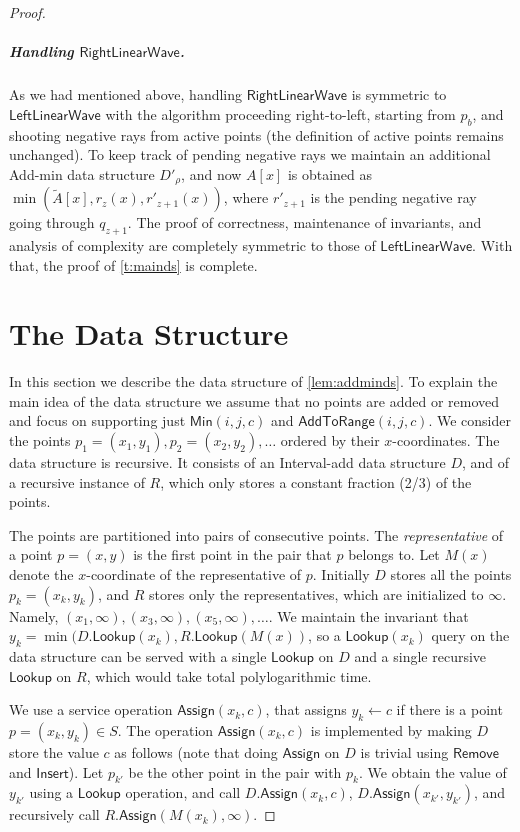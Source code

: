 \documentclass[a4paper,UKenglish,cleveref, autoref, thm-restate]{lipics-v2021}
\newcommand{\AtR}{\mathsf{AddToRange}}
\newcommand{\LLW}{\mathsf{LeftLinearWave}}
\newcommand{\RLW}{\mathsf{RightLinearWave}}
\newcommand{\assign}{\leftarrow}
\newcommand{\AssignOp}{\mathsf{Assign}}
\newcommand{\local}{\text{short }}
\newcommand{\addmin}{\text{Add-min }}
\newcommand{\Insert}{\mathsf{Insert}}
\newcommand{\Remove}{\mathsf{Remove}}
\newcommand{\Lookup}{\mathsf{Lookup}}
\newcommand{\Min}{\mathsf{Min}}
\newcommand{\TA}{\tilde{A}}
\newcommand{\para}[1]{\vspace{-0.1in} \subparagraph*{#1}}
\newcommand{\ray}{r}
\begin{document}
\begin{proof}
\para{Handling $\RLW$.} As we had mentioned above, handling $\RLW$ is symmetric to $\LLW$ with the algorithm proceeding right-to-left, starting from $p_b$, and shooting negative rays from active points (the definition of active points remains unchanged). To keep track of pending \local negative rays we maintain an additional Add-min data structure $D'_{\rho}$, and now $A[x]$ is obtained as $\min(\TA[x],\ray_z(x),\ray'_{z+1}(x))$, where $\ray'_{z+1}$ is the pending negative ray going through $q_{z+1}$. The proof of correctness, maintenance of invariants, and analysis of complexity are completely symmetric to those of $\LLW$.   
With that, the proof of \cref{t:mainds} is complete.

\section{The \addmin Data Structure}\label{sec:minadd}
In this section we describe the \addmin data structure of \cref{lem:addminds}.
To explain the main idea of the data structure we assume that no points are added or removed and focus on supporting just $\Min(i,j,c)$ and $\AtR(i,j,c)$. 
We consider the points 
$p_1=(x_1,y_1), p_2=(x_2,y_2), \ldots$ ordered by their $x$-coordinates.
The \addmin data structure is recursive. It consists of an Interval-add data structure $D$, and of a recursive instance of \addmin $R$, which only stores a constant fraction (2/3) of the points.

The points are partitioned into pairs of consecutive points. 
The {\em representative} of a point $p=(x,y)$ is the first point in the pair that $p$ belongs to. Let $M(x)$ denote the $x$-coordinate of the representative of $p$. 
Initially $D$ stores all the points $p_k=(x_k,y_k)$, and $R$ stores only the representatives, which are initialized to $\infty$. Namely, $(x_1,\infty), (x_3,\infty), (x_5,\infty), \ldots$.
We maintain the invariant that $y_k = \min(D.\Lookup(x_k), R.\Lookup(M(x))$, so a $\Lookup(x_k)$ query on the data structure can be served with a single $\Lookup$ on $D$ and a single recursive $\Lookup$ on $R$, which would take total polylogarithmic time.

We use a service operation $\AssignOp(x_k,c)$, that assigns $y_k \assign c$ if there is a point $p=(x_k,y_k) \in S$.
The operation $\AssignOp(x_k,c)$ is implemented by making $D$ store the value $c$ as follows (note that doing $\AssignOp$ on $D$ is trivial using $\Remove$ and $\Insert$). Let $p_{k'}$ be the other point in the pair with $p_k$. We obtain the value of $y_{k'}$ using a $\Lookup$ operation, and call $D.\AssignOp(x_{k},c)$, $D.\AssignOp(x_{k'},y_{k'})$, and recursively call $R.\AssignOp(M(x_k),\infty)$. 


\end{proof}
\end{document}

